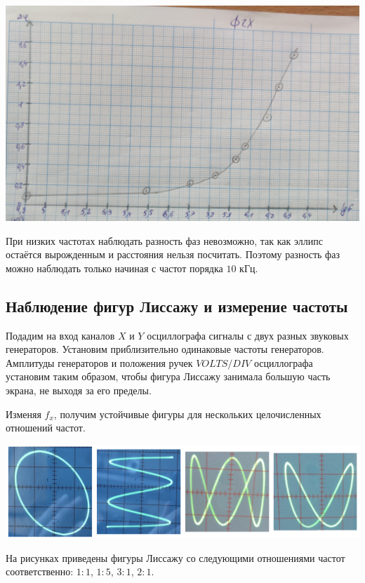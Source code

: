 \documentclass[a4paper, 12pt]{article} %
\begin{document}
\begin{center}
	\includegraphics[width=14cm]{13}
\end{center}

При низких частотах наблюдать разность фаз невозможно, так как эллипс остаётся вырожденным и расстояния нельзя посчитать. Поэтому разность фаз можно наблюдать только начиная с частот порядка $10$ кГц.


\subsection{Наблюдение фигур Лиссажу и измерение частоты}

Подадим на вход каналов $X$ и $Y$ осциллографа сигналы с двух разных звуковых генераторов. Установим приблизительно одинаковые частоты генераторов. Амплитуды генераторов и положения ручек $VOLTS/DIV$ осциллографа установим
таким образом, чтобы фигура Лиссажу занимала большую часть
экрана, не выходя за его пределы.

Изменяя $f_x$, получим устойчивые фигуры для нескольких целочисленных отношений частот.

\begin{center}
	\includegraphics[width=14cm]{11}
\end{center}

На рисунках приведены фигуры Лиссажу со следующими отношениями частот соответственно: $1 : 1$, $1 : 5$, $3 : 1$, $2 : 1$.
\end{document}
